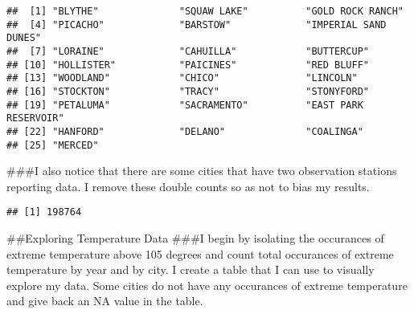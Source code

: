 \documentclass[]{article}
\newenvironment{Shaded}{\begin{snugshade}}{\end{snugshade}}
\newcommand{\CommentTok}[1]{\textcolor[rgb]{0.56,0.35,0.01}{\textit{#1}}}
\newcommand{\DataTypeTok}[1]{\textcolor[rgb]{0.13,0.29,0.53}{#1}}
\newcommand{\DecValTok}[1]{\textcolor[rgb]{0.00,0.00,0.81}{#1}}
\newcommand{\KeywordTok}[1]{\textcolor[rgb]{0.13,0.29,0.53}{\textbf{#1}}}
\newcommand{\NormalTok}[1]{#1}
\newcommand{\OperatorTok}[1]{\textcolor[rgb]{0.81,0.36,0.00}{\textbf{#1}}}
\newcommand{\OtherTok}[1]{\textcolor[rgb]{0.56,0.35,0.01}{#1}}
\newcommand{\StringTok}[1]{\textcolor[rgb]{0.31,0.60,0.02}{#1}}
\begin{document}
\begin{verbatim}
##  [1] "BLYTHE"              "SQUAW LAKE"          "GOLD ROCK RANCH"    
##  [4] "PICACHO"             "BARSTOW"             "IMPERIAL SAND DUNES"
##  [7] "LORAINE"             "CAHUILLA"            "BUTTERCUP"          
## [10] "HOLLISTER"           "PAICINES"            "RED BLUFF"          
## [13] "WOODLAND"            "CHICO"               "LINCOLN"            
## [16] "STOCKTON"            "TRACY"               "STONYFORD"          
## [19] "PETALUMA"            "SACRAMENTO"          "EAST PARK RESERVOIR"
## [22] "HANFORD"             "DELANO"              "COALINGA"           
## [25] "MERCED"
\end{verbatim}

\#\#\#I also notice that there are some cities that have two observation
stations reporting data. I remove these double counts so as not to bias
my results.

\begin{Shaded}
\end{Shaded}

\begin{verbatim}
## [1] 198764
\end{verbatim}

\#\#Exploring Temperature Data \#\#\#I begin by isolating the occurances
of extreme temperature above 105 degrees and count total occurances of
extreme temperature by year and by city. I create a table that I can use
to visually explore my data. Some cities do not have any occurances of
extreme temperature and give back an NA value in the table.

\begin{Shaded}
\end{Shaded}
\end{document}
